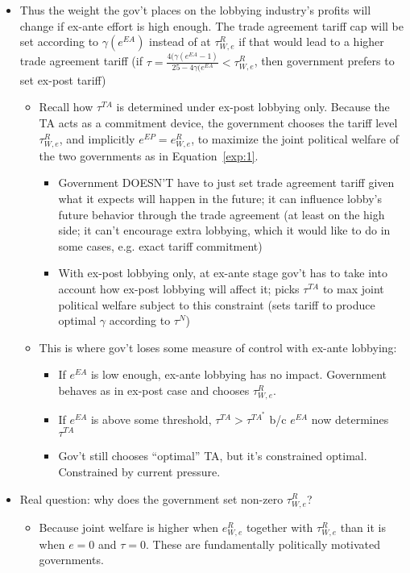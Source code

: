 \documentclass[12pt]{article}
\newcommand{\ga}{\gamma}
\begin{document}
\begin{itemize}
\newpage
	\item Thus the weight the gov't places on the lobbying industry's profits will change if ex-ante effort is high enough. The trade agreement tariff cap will be set according to $\ga(e^{EA})$ instead of at $\tau^R_{W,e}$ if that would lead to a higher trade agreement tariff (if $\tau = \frac{4(\ga(e^{EA}-1)}{25-4\ga(e^{EA}} < \tau^R_{W,e}$, then government prefers to set ex-post tariff)
			\begin{itemize}
				\item Recall how $\tau^{TA}$ is determined under ex-post lobbying only. Because the TA acts as a commitment device, the government chooses the tariff level $\tau^R_{W,e}$, and implicitly $e^{EP}=e^R_{W,e}$, to maximize the joint political welfare of the two governments as in Equation~\ref{exp:1}.
		\begin{itemize}
			\item Government DOESN'T have to just set trade agreement tariff given what it expects will happen in the future; it can influence lobby's future behavior through the trade agreement (at least on the high side; it can't encourage extra lobbying, which it would like to do in some cases, e.g. exact tariff commitment)
			\item With ex-post lobbying only, at ex-ante stage gov't has to take into account how ex-post lobbying will affect it; picks $\tau^{TA}$ to max joint political welfare subject to this constraint (sets tariff to produce optimal $\ga$ according to $\tau^N$)
		\end{itemize}
				\item This is where gov't loses some measure of control with ex-ante lobbying: 
					\begin{itemize}
						\item If $e^{EA}$ is low enough, ex-ante lobbying has no impact. Government behaves as in ex-post case and chooses $\tau^R_{W,e}$.
						\item If $e^{EA}$ is above some threshold, $\tau^{TA} >\tau^{TA^*}$ b/c $e^{EA}$ now determines $\tau^{TA}$
						\item Gov't still chooses ``optimal'' TA, but it's constrained optimal. Constrained by current pressure.
					\end{itemize}		
				\end{itemize}
	\item Real question: why does the government set non-zero $\tau^R_{W,e}$?
		\begin{itemize}
			\item Because joint welfare is higher when $e^R_{W,e}$ together with $\tau^R_{W,e}$ than it is when $e=0$ and $\tau=0$. These are fundamentally politically motivated governments.

\end{itemize}
\end{itemize}
\end{document}

